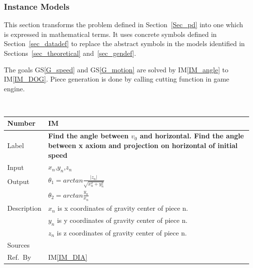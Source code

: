 \documentclass[12pt]{article}
\newcommand{\colAwidth}{0.13\textwidth}
\newcommand{\colBwidth}{0.82\textwidth}
\newcommand{\gsref}[1]{GS\ref{#1}}
\newcounter{instnum} %
\newcommand{\iref}[1]{IM\ref{#1}}
\begin{document}
\subsubsection{Instance Models} \label{sec_instance}    

This section transforms the problem defined in Section~\ref{Sec_pd} into 
one which is expressed in mathematical terms. It uses concrete symbols defined 
in Section~\ref{sec_datadef} to replace the abstract symbols in the models 
identified in Sections~\ref{sec_theoretical} and~\ref{sec_gendef}.

The goals \gsref{G_speed} and \gsref{G_motion} are solved by \iref{IM_angle} to \iref{IM_DOG}.
Piece generation is done by calling cutting function in game engine.   

~\newline


\noindent
\begin{minipage}{\textwidth}
	\renewcommand*{\arraystretch}{1.5}
	\begin{tabular}{| p{\colAwidth} | p{\colBwidth}|}
		\hline
		\rowcolor[gray]{0.9}
		Number& IM{instnum}\theinstnum \label{IM_angle}\\
		\hline
		Label& \bf Find the angle between $v_{0}$ and horizontal. Find the angle between x axiom and projection on horizontal of initial speed \\
		\hline
		Input&$x_{n}$,$y_{n}$,$z_{n}$\\
		\hline
		Output&$\theta_{1}=arctan \frac{|z_{n}|}{\sqrt{x_{n}^2+y_{n}^2}}$\\
		&$\theta_{2}=arctan \frac{y_{n}}{x_{n}}$\\
		\hline
		Description&$x_{n}$ is x coordinates of gravity center of piece n.\\
		&$y_{n}$ is y coordinates of gravity center of piece n.\\
		&$z_{n}$ is z coordinates of gravity center of piece n.\\
		\hline
		Sources&~\ \ \\
		\hline
		Ref.\ By & \iref{IM_DIA}\\
		\hline
	\end{tabular}
\end{minipage}\\

~\newline
\end{document}
